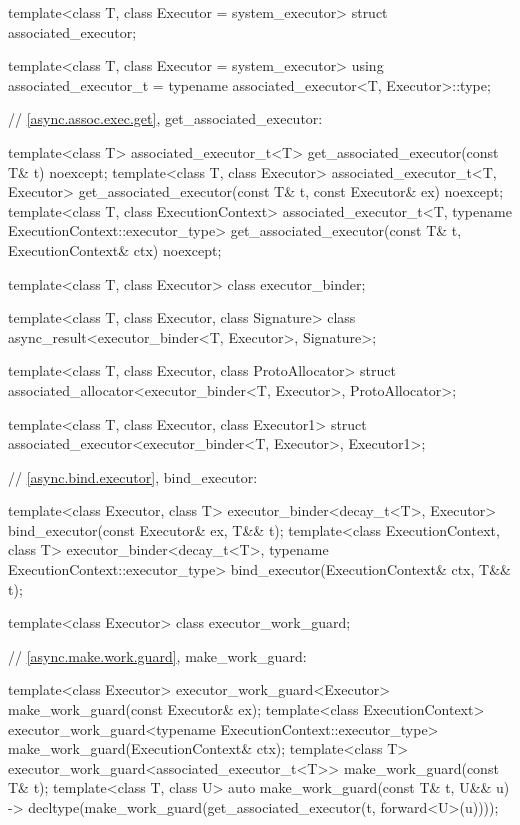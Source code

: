 \begin{codeblock}
{{{  template<class T, class Executor = system_executor>
    struct associated_executor;

  template<class T, class Executor = system_executor>
    using associated_executor_t = typename associated_executor<T, Executor>::type;

  // \ref{async.assoc.exec.get}, get_associated_executor:

  template<class T>
    associated_executor_t<T> get_associated_executor(const T& t) noexcept;
  template<class T, class Executor>
    associated_executor_t<T, Executor>
      get_associated_executor(const T& t, const Executor& ex) noexcept;
  template<class T, class ExecutionContext>
    associated_executor_t<T, typename ExecutionContext::executor_type>
      get_associated_executor(const T& t, ExecutionContext& ctx) noexcept;

  template<class T, class Executor>
    class executor_binder;

  template<class T, class Executor, class Signature>
    class async_result<executor_binder<T, Executor>, Signature>;

  template<class T, class Executor, class ProtoAllocator>
    struct associated_allocator<executor_binder<T, Executor>, ProtoAllocator>;

  template<class T, class Executor, class Executor1>
    struct associated_executor<executor_binder<T, Executor>, Executor1>;

  // \ref{async.bind.executor}, bind_executor:

  template<class Executor, class T>
    executor_binder<decay_t<T>, Executor>
      bind_executor(const Executor& ex, T&& t);
  template<class ExecutionContext, class T>
    executor_binder<decay_t<T>, typename ExecutionContext::executor_type>
      bind_executor(ExecutionContext& ctx, T&& t);

  template<class Executor>
    class executor_work_guard;

  // \ref{async.make.work.guard}, make_work_guard:

  template<class Executor>
    executor_work_guard<Executor>
      make_work_guard(const Executor& ex);
  template<class ExecutionContext>
    executor_work_guard<typename ExecutionContext::executor_type>
      make_work_guard(ExecutionContext& ctx);
  template<class T>
    executor_work_guard<associated_executor_t<T>>
      make_work_guard(const T& t);
  template<class T, class U>
    auto make_work_guard(const T& t, U&& u)
      -> decltype(make_work_guard(get_associated_executor(t, forward<U>(u))));

}}}
\end{codeblock}
